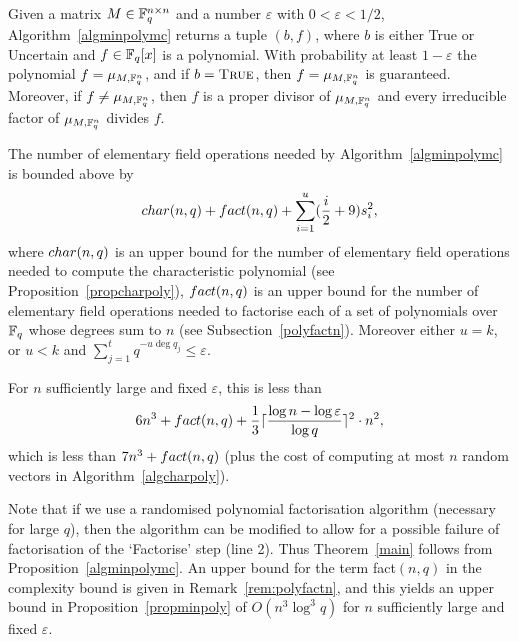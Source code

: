 \begin{Prop}\label{propminpoly}
%
Given a matrix $M \in \mathbb{F}_q^{n \times n}$ and a number
$\varepsilon$ with $0 < \varepsilon < 1/2$, Algorithm~\ref{algminpolymc}
returns a tuple $(b,f)$, where $b$ is either\/ {\sc True} or\/ {\sc Uncertain}
and $f \in \mathbb{F}_q[x]$ is a polynomial. With probability at least $1-\varepsilon$
the polynomial $f=\mu_{M,\mathbb{F}_q^n}$, and if
\/ $b = \mbox{\sc True}$, then
$f = \mu_{M,\mathbb{F}_q^n}$ is guaranteed. Moreover, 
if\/ $f \ne \mu_{M,\mathbb{F}_q^n}$, then 
$f$ is a proper divisor of $\mu_{M,\mathbb{F}_q^n}$ and
every irreducible factor of $\mu_{M,\mathbb{F}_q^n}$ divides $f$.

The number of elementary field operations needed by 
Algorithm~\ref{algminpolymc} is bounded above by
\[ 
{\rm char}(n,q) + {\rm fact}(n,q) + 
  \sum_{i=1}^u (\frac{i}{2}+9)s_i^2,
\]
where ${\rm char}(n,q)$ is an upper bound for the number of elementary field operations needed to
compute the characteristic polynomial (see
Proposition~\ref{propcharpoly}), ${\rm fact}(n,q)$ is an upper bound for 
the number of elementary field
operations needed to factorise each of a set of polynomials over $\mathbb{F}_q$ whose degrees sum to $n$
(see Subsection~{\rm\ref{polyfactn}}). Moreover either $u=k$, or $u<k$ and
$\sum_{j=1}^t q^{-u\deg q_j} \le \varepsilon$.

For $n$ sufficiently large and fixed $\varepsilon$, this is less than
\[ 6n^3 + {\rm fact}(n,q) + 
\frac{1}{3} \lceil\frac{\log n-\log \varepsilon}{\log q}\rceil^2 \cdot n^2,
\]
which is less than $7n^3 + {\rm fact}(n,q)$ (plus the cost of computing at most $n$ random 
vectors in Algorithm~\ref{algcharpoly}).
\end{Prop}


\begin{Rem}
Note that if we use a randomised polynomial factorisation algorithm
(necessary for large $q$), then the algorithm can be modified to allow
for a possible failure of factorisation of the `Factorise' step (line
2). Thus Theorem~\ref{main} follows from Proposition~\ref{algminpolymc}.
An upper bound for the term {\rm fact}$(n,q)$ in the complexity
bound is given in Remark~{\rm\ref{rem:polyfactn}}, and this yields an
upper bound in Proposition~{\rm\ref{propminpoly}} of $O(n^3\log^3 q)$
for $n$ sufficiently large and fixed $\varepsilon$.
\end{Rem}

